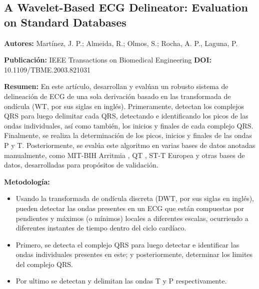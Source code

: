 \documentclass[spanish,11pt,letterpaper,oneside]{memoir}
\begin{document}
%
%
%
%

\subsection{A Wavelet-Based ECG Delineator: Evaluation on Standard Databases \cite{Martinez04}}
\textbf{Autores:} Martínez, J. P.; Almeida, R.; Olmos, S.; Rocha, A. P., Laguna, P.

\textbf{Publicación:} IEEE Transactions on Biomedical Engineering
\textbf{DOI:} 10.1109/TBME.2003.821031

\textbf{Resumen:} En este artículo, desarrollan y evalúan un robusto sistema de delineación de ECG de una sola derivación basado en las transformada de ondícula (WT, por sus siglas en inglés). Primeramente, detectan los complejos QRS para luego delimitar cada QRS, detectando e identificando los picos de las ondas individuales, así como también, los inicios y finales de cada complejo QRS. Finalmente, se realiza la determinación de los picos, inicios y finales de las ondas P y T. Posteriormente, se evalúa este algoritmo en varias bases de datos anotadas manualmente, como MIT-BIH Arritmia \cite{arritmiadb}, QT \cite{qtdb}, ST-T Europea \cite{st-tdb} y otras bases de datos, desarrolladas para propósitos de validación.

\textbf{Metodología:} 
\begin{itemize}
	\item Usando la transformada de ondícula discreta (DWT, por sus siglas en inglés), pueden detectar las ondas presentes en un ECG que están compuestas por pendientes y máximos (o mínimos) locales a diferentes escalas, ocurriendo a diferentes instantes de tiempo dentro del ciclo cardíaco.
	\item Primero, se detecta el complejo QRS para luego detectar e identificar las ondas individuales presentes en este; y posteriormente, determinar los limites del complejo QRS.
	\item Por ultimo se detectan y delimitan las ondas T y P respectivamente.
\end{itemize}
\end{document}
